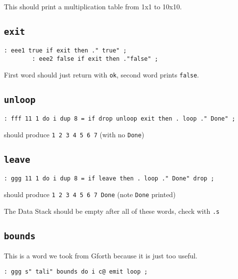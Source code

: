 \noindent This should print a multiplication table from 1x1 to 10x10.

\subsection{\texttt{exit}}

\begin{lstlisting}[frame=lines]
        : eee1 true if exit then ." true" ; 
        : eee2 false if exit then ."false" ; 
\end{lstlisting}

\noindent First word should just return with \texttt{ok}, second word prints \texttt{false}.


\subsection{\texttt{unloop}}

\begin{lstlisting}[frame=lines]
        : fff 11 1 do i dup 8 = if drop unloop exit then . loop ." Done" ; 
\end{lstlisting}

\noindent should produce \texttt{1 2 3 4 5 6 7} (with no \texttt{Done})


\subsection{\texttt{leave}}

\begin{lstlisting}[frame=lines]
        : ggg 11 1 do i dup 8 = if leave then . loop ." Done" drop ; 
\end{lstlisting}

\noindent should produce \texttt{1 2 3 4 5 6 7 Done} (note \texttt{Done} printed)

The Data Stack should be empty after all of these words, check with \texttt{.s}

\subsection{\texttt{bounds}} 

This is a word we took from Gforth because it is just too useful.

\begin{lstlisting}[frame=lines]
        : ggg s" tali" bounds do i c@ emit loop ;
\end{lstlisting}

